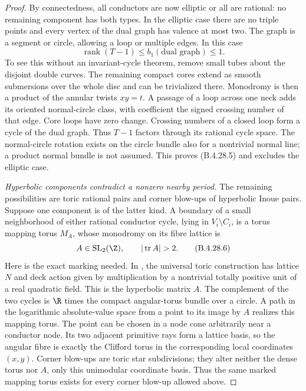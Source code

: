 \begin{proof}
By connectedness, all conductors are now elliptic or
all are rational: no remaining component has both
types. In the elliptic case there are no triple points
and every vertex of the dual graph has valence at most
two. The graph is a segment or circle, allowing a loop
or multiple edges. In this case
\[
 \operatorname{rank}(T-1)\le b_1(\text{dual graph})
 \le1.                                               \tag{B.4.28.5}
\]
To see this without an invariant-cycle theorem, remove
small tubes about the disjoint double curves. The
remaining compact cores extend as smooth submersions
over the whole disc and can be trivialized there.
Monodromy is then a product of the annular twists
$xy=t$. A passage of a loop across one neck adds its
oriented normal-circle class, with coefficient the
signed crossing number of that edge. Core loops have
zero change. Crossing numbers of a closed loop form a
cycle of the dual graph. Thus $T-1$ factors through its
rational cycle space. The normal-circle rotation exists
on the circle bundle also for a nontrivial normal line;
a product normal bundle is not assumed. This proves
(B.4.28.5) and excludes the elliptic case.

\emph{Hyperbolic components contradict a nonzero nearby period.}
The remaining possibilities are toric rational pairs
and corner blow-ups of hyperbolic Inoue pairs. Suppose
one component is of the latter kind. A boundary of a
small neighborhood of either rational conductor cycle,
lying in $V_i\setminus C_i$, is a torus mapping torus
$M_A$, whose monodromy on its fibre lattice is
\[
 A\in\operatorname{SL}_2(\Z),\qquad
 |\operatorname{tr}A|>2.                             \tag{B.4.28.6}
\]
Here is the exact marking needed. In
\citet[Section 15, Theorem 15.1 and the following
paragraph, pp.~130--131]{Oda1978D}, the universal
toric construction has lattice $N$ and deck action
given by multiplication by a nontrivial totally
positive unit of a real quadratic field. This is
the hyperbolic matrix $A$. The complement of the
two cycles is $\R$ times the compact angular-torus
bundle over a circle. A path in the logarithmic
absolute-value space from a point to its image by
$A$ realizes this mapping torus. The point can be
chosen in a node cone arbitrarily near a conductor
node. Its two adjacent primitive rays form a lattice
basis, so the angular fibre is exactly the Clifford
torus in the corresponding local coordinates
$(x,y)$. Corner blow-ups are toric star subdivisions;
they alter neither the dense torus nor $A$, only
this unimodular coordinate basis. Thus the same
marked mapping torus exists for every corner
blow-up allowed above.


\end{proof}
